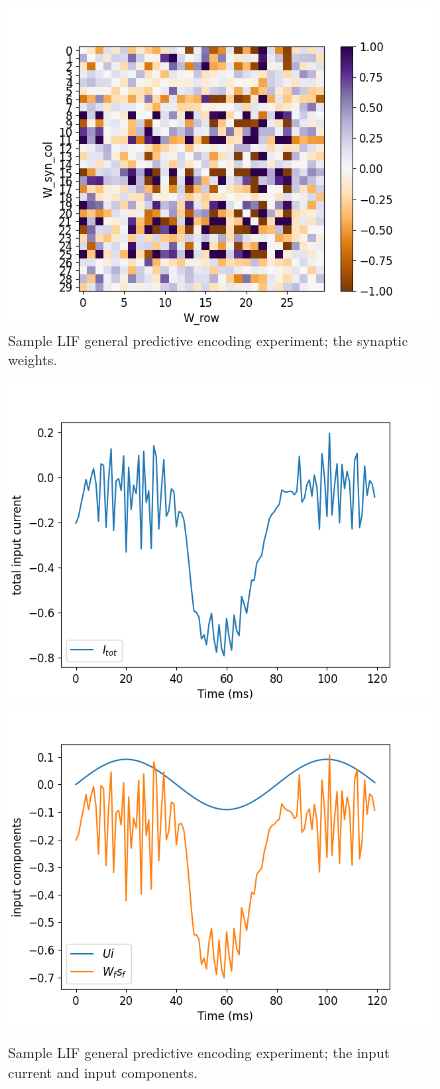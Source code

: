 \documentclass[mphil,deptreport,ianc]{infthesis} %
\begin{document}
\begin{figure}[!h]
    \centering
    \includegraphics[width=0.6\columnwidth]{figures/Supplementary/gating/LIF/GeneralPredictiveEncoding/01-04_16-46-28-427/test_heatmap_W.png}
    \caption{Sample LIF general predictive encoding experiment; the synaptic weights.}
    \label{fig:LIF_GPE_1_W_syn}
\end{figure}


\begin{figure}[!h]
    \centering
    \includegraphics[width=0.49\columnwidth]{figures/Supplementary/gating/LIF/GeneralPredictiveEncoding/01-04_16-46-28-427/test_plot_I_tot_LIF_seed_27.png}
    \includegraphics[width=0.49\columnwidth]{figures/Supplementary/gating/LIF/GeneralPredictiveEncoding/01-04_16-46-28-427/test_plot_input_components_LIF_seed_27.png}
    \caption{Sample LIF general predictive encoding experiment; the input current and input components.}
    \label{fig:LIF_GPE_1_I_tot_in_comp}
\end{figure}
\end{document}
